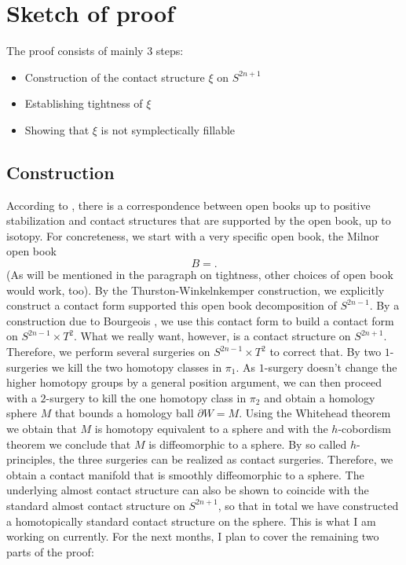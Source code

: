 \documentclass{amsart}
\begin{document}
\section*{Sketch of proof}
The proof consists of mainly 3 steps:
\begin{itemize}
    \item Construction of the contact structure $\xi$ on $S^{2n+1}$
    \item Establishing tightness of $\xi$
    \item Showing that $\xi$ is not symplectically fillable
\end{itemize}
\subsection*{Construction}
According to \cite{Giroux02}, there is a correspondence between open books up to positive
stabilization and contact structures that are supported by the open book, up to isotopy.
For concreteness, we start with a very specific open book, the Milnor open book
\[
    B = .  
\]
(As will be mentioned in the paragraph on tightness, other choices of open book would work, too).
By the Thurston-Winkelnkemper construction, we explicitly construct a contact form supported
this open book decomposition of $S^{2n-1}$.
By a construction due to Bourgeois \cite{Bourgeois02}, we use this contact form to 
build a contact form on $S^{2n-1} \times T^2$.
What we really want, however, is a contact structure on $S^{2n+1}$. Therefore,
we perform several surgeries on $S^{2n-1}\times T^2$ to correct that.
By two $1$-surgeries we kill the two homotopy classes in $\pi_1$.
As $1$-surgery doesn't change the higher homotopy groups by a general position argument,
we can then proceed with a $2$-surgery to kill the one homotopy class in $\pi_2$
and obtain a homology sphere $M$ that bounds a homology ball $\partial W = M$.
Using the Whitehead theorem we obtain that $M$ is homotopy equivalent to a sphere 
and with the $h$-cobordism theorem we conclude that $M$ is diffeomorphic to a sphere.
By so called $h$-principles, the three surgeries can be realized as contact surgeries.
Therefore, we obtain a contact manifold that is smoothly diffeomorphic to a sphere.
The underlying almost contact structure can also be shown to coincide with the standard almost
contact structure on $S^{2n+1}$, so that in total we have constructed a
homotopically standard contact structure on the sphere.
This is what I am working on currently. For the next months, I plan to cover the remaining
two parts of the proof:
\end{document}
